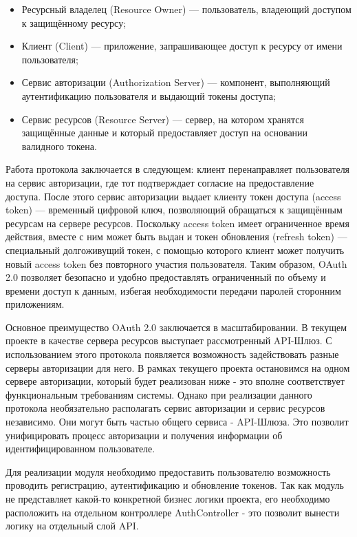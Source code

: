 	\begin{itemize}[label=$\bullet$]
		\item Ресурсный владелец (Resource Owner) — пользователь, владеющий доступом к защищённому ресурсу;
		\item Клиент (Client) — приложение, запрашивающее доступ к ресурсу от имени пользователя;
		\item Сервис авторизации (Authorization Server) — компонент, выполняющий аутентификацию пользователя и выдающий токены доступа;
		\item Сервис ресурсов (Resource Server) — сервер, на котором хранятся защищённые данные и который предоставляет доступ на основании валидного токена.
	\end{itemize}

	Работа протокола заключается в следующем: клиент перенаправляет пользователя на сервис авторизации, где тот подтверждает согласие на предоставление доступа. После этого сервис авторизации выдает клиенту токен доступа (access token) — временный цифровой ключ, позволяющий обращаться к защищённым ресурсам на сервере ресурсов. Поскольку access token имеет ограниченное время действия, вместе с ним может быть выдан и токен обновления (refresh token) — специальный долгоживущий токен, с помощью которого клиент может получить новый access token без повторного участия пользователя. Таким образом, OAuth 2.0 позволяет безопасно и удобно предоставлять ограниченный по объему и времени доступ к данным, избегая необходимости передачи паролей сторонним приложениям.

	Основное преимущество OAuth 2.0 заключается в масштабировании. В текущем проекте в качестве сервера ресурсов выступает рассмотренный API-Шлюз. С использованием этого протокола появляется возможность задействовать разные серверы авторизации для него. В рамках текущего проекта остановимся на одном сервере авторизации, который будет реализован ниже - это вполне соответствует функциональным требованиям системы. Однако при реализации данного протокола необязательно располагать сервис авторизации и сервис ресурсов независимо. Они могут быть частью общего сервиса - API-Шлюза. Это позволит унифицировать процесс авторизации и получения информации об идентифицированном пользователе.
	
	Для реализации модуля необходимо предоставить пользователю возможность проводить регистрацию, аутентификацию и обновление токенов. Так как модуль не представляет какой-то конкретной бизнес логики проекта, его необходимо расположить на отдельном контроллере AuthController - это позволит вынести логику на отдельный слой API.
	
